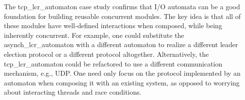 The tcp\_lcr\_automaton case study confirms that I/O automata can be a good foundation for building reusable concurrent modules.
The key idea is that all of these modules have well-defined interactions when composed, while being inherently concurrent.
For example, one could substitute the asynch\_lcr\_automaton with a different automaton to realize a different leader election protocol or a different protocol altogether.
Alternatively, the tcp\_lcr\_automaton could be refactored to use a different communication mechanism, e.g., UDP.
One need only focus on the protocol implemented by an automaton when composing it with an existing system, as opposed to worrying about interacting threads and race conditions.
\fi



